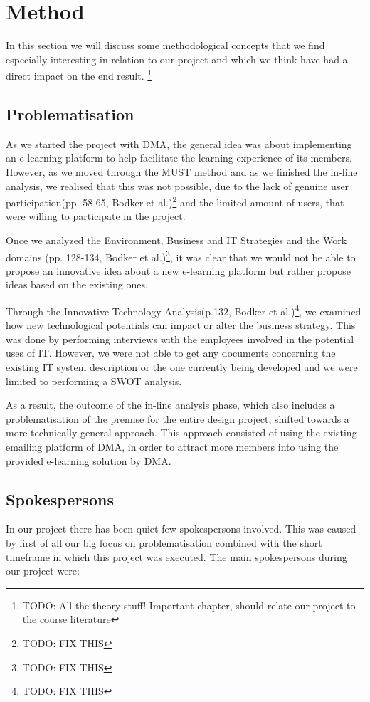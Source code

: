 \section{Method}


In this section we will discuss some methodological concepts that we find especially interesting in relation to our project and which we think have had a direct impact on the end result. 
\footnote{TODO: All the theory stuff! Important chapter, should relate our project to the course literature}

\subsection{Problematisation}
As we started the project with DMA, the general idea was about implementing an e-learning platform to help facilitate the learning experience of its members. However, as we moved through the MUST method and as we finished the in-line analysis, we realised that this was not possible, due to the lack of genuine user participation(pp. 58-65, Bodker et al.)\footnote{TODO: FIX THIS} and the limited amount of users, that were willing to participate in the project. 

Once we analyzed the Environment, Business and IT Strategies and the Work domains (pp. 128-134, Bodker et al.)\footnote{TODO: FIX THIS}, it was clear that we would not be able to propose an innovative idea about a new e-learning platform but rather propose ideas based on the existing ones. 

Through the Innovative Technology Analysis(p.132, Bodker et al.)\footnote{TODO: FIX THIS}, we examined how new technological potentials can impact or alter the business strategy. This was done by performing interviews with the employees involved in the potential uses of IT. However, we were not able to get any documents concerning the existing IT system description or the one currently being developed and we were limited to performing a SWOT analysis.

As a result, the outcome of the in-line analysis phase, which also includes a problematisation of the premise for the entire design project, shifted towards a more technically general approach. This approach consisted of using the existing emailing platform of DMA, in order to attract more members into using the provided e-learning solution by DMA.


\subsection{Spokespersons}
In our project there has been quiet few spokespersons involved. This was caused by first of all our big focus on problematisation combined with the short timeframe in which this project was executed. The main spokespersons during our project were:

